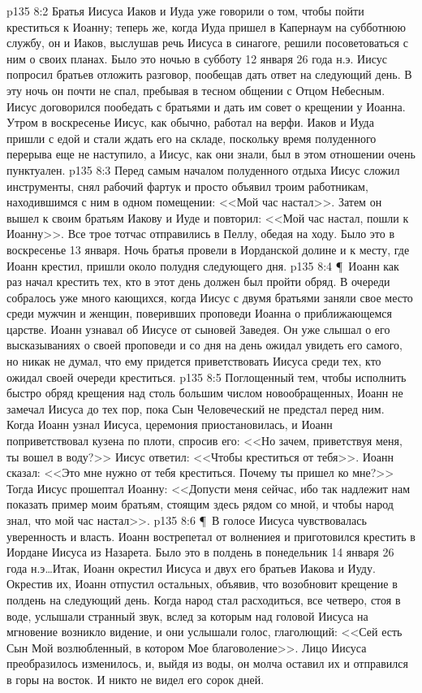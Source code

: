 \vs p135 8:2 Братья Иисуса Иаков и Иуда уже говорили о том, чтобы пойти креститься к Иоанну; теперь же, когда Иуда пришел в Капернаум на субботнюю службу, он и Иаков, выслушав речь Иисуса в синагоге, решили посоветоваться с ним о своих планах. Было это ночью в субботу 12 января 26 года н.э. Иисус попросил братьев отложить разговор, пообещав дать ответ на следующий день. В эту ночь он почти не спал, пребывая в тесном общении с Отцом Небесным. Иисус договорился пообедать с братьями и дать им совет о крещении у Иоанна. Утром в воскресенье Иисус, как обычно, работал на верфи. Иаков и Иуда пришли с едой и стали ждать его на складе, поскольку время полуденного перерыва еще не наступило, а Иисус, как они знали, был в этом отношении очень пунктуален.
\vs p135 8:3 Перед самым началом полуденного отдыха Иисус сложил инструменты, снял рабочий фартук и просто объявил троим работникам, находившимся с ним в одном помещении: <<Мой час настал>>. Затем он вышел к своим братьям Иакову и Иуде и повторил: <<Мой час настал, пошли к Иоанну>>. Все трое тотчас отправились в Пеллу, обедая на ходу. Было это в воскресенье 13 января. Ночь братья провели в Иорданской долине и к месту, где Иоанн крестил, пришли около полудня следующего дня.
\vs p135 8:4 \P\ Иоанн как раз начал крестить тех, кто в этот день должен был пройти обряд. В очереди собралось уже много кающихся, когда Иисус с двумя братьями заняли свое место среди мужчин и женщин, поверивших проповеди Иоанна о приближающемся царстве. Иоанн узнавал об Иисусе от сыновей Заведея. Он уже слышал о его высказываниях о своей проповеди и со дня на день ожидал увидеть его самого, но никак не думал, что ему придется приветствовать Иисуса среди тех, кто ожидал своей очереди креститься.
\vs p135 8:5 Поглощенный тем, чтобы исполнить быстро обряд крещения над столь большим числом новообращенных, Иоанн не замечал Иисуса до тех пор, пока Сын Человеческий не предстал перед ним. Когда Иоанн узнал Иисуса, церемония приостановилась, и Иоанн поприветствовал кузена по плоти, спросив его: <<Но зачем, приветствуя меня, ты вошел в воду?>> Иисус ответил: <<Чтобы креститься от тебя>>. Иоанн сказал: <<Это мне нужно от тебя креститься. Почему ты пришел ко мне?>> Тогда Иисус прошептал Иоанну: <<Допусти меня сейчас, ибо так надлежит нам показать пример моим братьям, стоящим здесь рядом со мной, и чтобы народ знал, что мой час настал>>.
\vs p135 8:6 \P\ В голосе Иисуса чувствовалась уверенность и власть. Иоанн вострепетал от волнениея и приготовился крестить в Иордане Иисуса из Назарета. Было это в полдень в понедельник 14 января 26 года н.э\ldots  Итак, Иоанн окрестил Иисуса и двух его братьев Иакова и Иуду. Окрестив их, Иоанн отпустил остальных, объявив, что возобновит крещение в полдень на следующий день. Когда народ стал расходиться, все четверо, стоя в воде, услышали странный звук, вслед за которым над головой Иисуса на мгновение возникло видение, и они услышали голос, глаголющий: <<Сей есть Сын Мой возлюбленный, в котором Мое благоволение>>. Лицо Иисуса преобразилось изменилось, и, выйдя из воды, он молча оставил их и отправился в горы на восток. И никто не видел его сорок дней.
